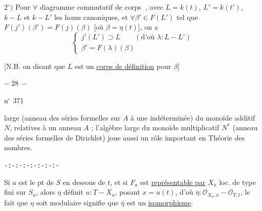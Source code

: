 
$2^\circ)$ Pour $\forall$ diagramme commutatif de corps \textcircled{}, avec $L=k(t)$, $L'=k(t')$, $k\mathbin{-}L$ et $k\mathbin{-}L'$ les homs canoniques, et $\forall\beta'\in F(L')$ tel que $F(j')(\beta')=F(j)(\beta)$ [où $\beta=\eta(t)$], on a
\[
\left\{\begin{array}{l}
j'(L')\supset L\qquad(\text{d'où }\lambda:L\mathbin{-}L')\\
\beta'=F(\lambda)(\beta)
\end{array}\right.
\]

[N.B. on   disant que $L$ est un \uline{corps de définition} pour $\beta$]
\begin{center}$-\ 28\ -$\end{center}
\hfill n$^\circ$ 371

large (anneau des séries formelles sur $A$ à une indéterminée) du monoïde additif $N$, relatives à un anneau $A$ ; l'algèbre large du monoïde multiplicatif $N^*$ (anneau des séries formelles de Dirichlet) joue aussi un rôle important en Théorie des nombres.

\begin{center}\texttt{-:-:-:-:-:-:-:-}\end{center}
Si $a$ est le pt de $S$ en dessous de $t$, et si $F_a$ est \uline{représentable par} $X_a$  loc. de type fini sur $S_a$,  alors $\eta$ définit $u:T\mathbin{-}X_a$, posant $x=u(t)$, d'où $\bar\eta:\mathcal O_{X_a,x}\mathbin{-}\mathcal O_{T,t}$, le fait que $\eta$ soit modulaire  signifie que $\bar\eta$ est un \uline{isomorphisme}.

